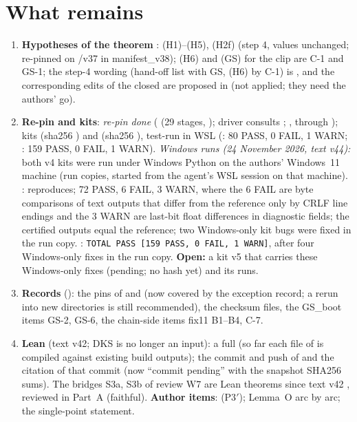 \documentclass[11pt]{article}
\begin{document}
\section{What remains}\label{M:sec:remains}
\begin{enumerate}[leftmargin=*]
\item \textbf{Hypotheses of the theorem} \tH: (H1)--(H5), (H2f) (step 4, values unchanged; re-pinned on /v37 in manifest\_v38); (H6) and (GS) for the clip are C-1 and GS-1; the step-4 wording (hand-off list with GS, (H6) by C-1) is , and the corresponding edits of the closed  are proposed in  (not applied; they need the authors' go).
\item \textbf{Re-pin and kits}: \emph{re-pin done} ( (29 stages, ); driver  consults ; ,  through ); kits  (sha256 ) and  (sha256 ), test-run in WSL (: 80 PASS, 0 FAIL, 1 WARN; : 159 PASS, 0 FAIL, 1 WARN). \emph{Windows runs (24 November 2026, text v44):} both v4 kits were run under Windows Python on the authors' Windows~11 machine (run copies, started from the agent's WSL session on that machine). : reproduces; 72 PASS, 6 FAIL, 3 WARN, where the 6 FAIL are byte comparisons of text outputs that differ from the reference only by CRLF line endings and the 3 WARN are last-bit float differences in diagnostic fields; the certified outputs equal the reference; two Windows-only kit bugs were fixed in the run copy. : \texttt{TOTAL PASS [159 PASS, 0 FAIL, 1 WARN]}, after four Windows-only fixes in the run copy. \textbf{Open:} a kit v5 that carries these Windows-only fixes (pending; no hash yet) and its runs.
\item \textbf{Records} (): the pins of  and  (now covered by the exception record; a rerun into new directories is still recommended), the checksum files, the GS\_boot items GS-2, GS-6, the chain-side items fix11 B1--B4, C-7.
\item \textbf{Lean} (text v42; DKS is no longer an input): a full  (so far each file of  is compiled against existing build outputs); the commit and push of  and the citation of that commit (now ``commit pending'' with the snapshot SHA256 sums). The bridges S3a, S3b of review W7 are Lean theorems since text v42 \LeanSthree, reviewed in  Part~A (faithful). \textbf{Author items}: (P3$'$); Lemma~O arc by arc; the single-point statement.

\end{enumerate}
\end{document}
